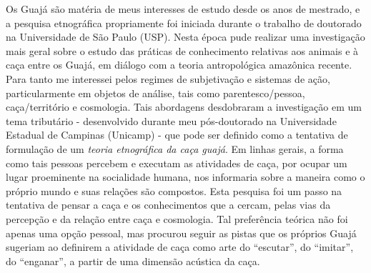 Os Guajá são matéria de meus interesses de estudo desde os anos de
mestrado, e a pesquisa etnográfica propriamente foi iniciada durante o
trabalho de doutorado na Universidade de São Paulo (USP). Nesta época
pude realizar uma investigação mais geral sobre o estudo das práticas de
conhecimento relativas aos animais e à caça entre os Guajá, em diálogo
com a teoria antropológica amazônica recente. Para tanto me interessei
pelos regimes de subjetivação e sistemas de ação, particularmente em
objetos de análise, tais como parentesco/pessoa, caça/território e
cosmologia. Tais abordagens desdobraram a investigação em um tema
tributário - desenvolvido durante meu pós-doutorado na Universidade
Estadual de Campinas (Unicamp) - que pode ser definido como a tentativa
de formulação de um \emph{teoria etnográfica da caça guajá}. Em linhas
gerais, a forma como tais pessoas percebem e executam as atividades de
caça, por ocupar um lugar proeminente na socialidade humana, nos
informaria sobre a maneira como o próprio mundo e suas relações são
compostos. Esta pesquisa foi um passo na tentativa de pensar a caça e os
conhecimentos que a cercam, pelas vias da percepção e da relação entre
caça e cosmologia. Tal preferência teórica não foi apenas uma opção
pessoal, mas procurou seguir as pistas que os próprios Guajá sugeriam ao
definirem a atividade de caça como arte do ``escutar'', do ``imitar'', do
``enganar'', a partir de uma dimensão acústica da caça.

